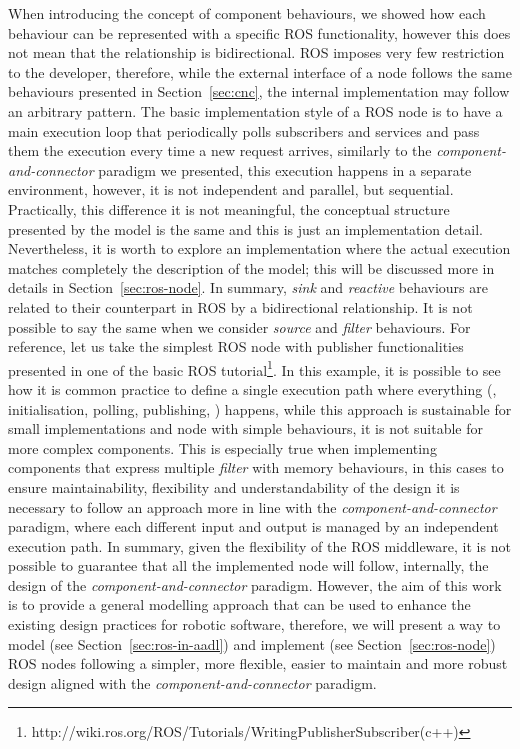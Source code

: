 When introducing the concept of component behaviours, we showed how each behaviour can be represented with a specific ROS functionality, however this does not mean that the relationship is bidirectional. ROS imposes very few restriction to the developer, therefore, while the external interface of a node follows the same behaviours presented in Section~\ref{sec:cnc}, the internal implementation may follow an arbitrary pattern. The basic implementation style of a ROS node is to have a main execution loop that periodically polls subscribers and services and pass them the execution every time a new request arrives, similarly to the \textit{component-and-connector} paradigm we presented, this execution happens in a separate environment, however, it is not independent and parallel, but sequential. Practically, this difference it is not meaningful, the conceptual structure presented by the model is the same and this is just an implementation detail. Nevertheless, it is worth to explore an implementation where the actual execution matches completely the description of the model; this will be discussed more in details in Section~\ref{sec:ros-node}. In summary, \textit{sink} and \textit{reactive} behaviours are related to their counterpart in ROS by a bidirectional relationship. It is not possible to say the same when we consider \textit{source} and \textit{filter} behaviours. For reference, let us take the simplest ROS node with publisher functionalities presented in one of the basic ROS tutorial\footnote{http://wiki.ros.org/ROS/Tutorials/WritingPublisherSubscriber(c++)}. In this example, it is possible to see how it is common practice to define a single execution path where everything (\eg, initialisation, polling, publishing, \etc) happens, while this approach is sustainable for small implementations and node with simple behaviours,  it is not suitable for more complex components. This is especially true when implementing components that express multiple \textit{filter} with memory behaviours, in this cases to ensure maintainability, flexibility and understandability of the design it is necessary to follow an approach more in line with the \textit{component-and-connector} paradigm, where each different input and output is managed by an independent execution path. In summary, given the flexibility of the ROS middleware, it is not possible to guarantee that all the implemented node will follow, internally, the design of the \textit{component-and-connector} paradigm. However, the aim of this work is to provide a general modelling approach that can be used to enhance the existing design practices for robotic software, therefore, we will present a way to model (see Section~\ref{sec:ros-in-aadl}) and implement (see Section~\ref{sec:ros-node}) ROS nodes following a simpler, more flexible, easier to maintain and more robust design aligned with the \textit{component-and-connector} paradigm.

